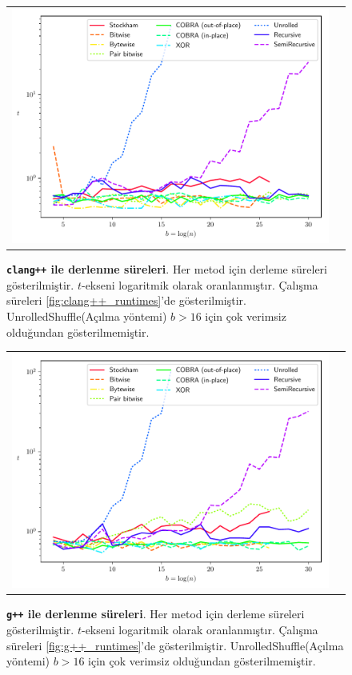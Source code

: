 \documentclass[10pt]{article}
\begin{document}
\begin{figure}[ht!]
\centering
\begin{tabular}{cc}
  \includegraphics[width=4.5in]{results/clang++_compile_times.pdf}
\end{tabular}
\caption{{\bf {\tt clang++} ile derlenme s\"{u}releri}. 
Her metod i\c{c}in derleme s\"{u}releri g\"{o}sterilmi\c{s}tir. 
$t$-ekseni logaritmik olarak oranlanm{\i}\c{s}t{\i}r. \c{C}al{\i}\c{s}ma s\"{u}releri 
\ref{fig:clang++_runtimes}'de g\"{o}sterilmi\c{s}tir. 
UnrolledShuffle(A\c{c}{\i}lma y\"{o}ntemi) $b>16$ i\c{c}in \c{c}ok 
verimsiz oldu\u{g}undan g\"{o}sterilmemi\c{s}tir.
  \label{fig:clang++_compile_times} 
}
\end{figure}

\begin{figure}[ht!]
\centering
\begin{tabular}{cc}
  \includegraphics[width=4.5in]{results/g++_compile_times.pdf}
\end{tabular}
\caption{{\bf {\tt g++} ile derlenme s\"{u}releri}.
Her metod i\c{c}in derleme s\"{u}releri g\"{o}sterilmi\c{s}tir. 
$t$-ekseni logaritmik olarak oranlanm{\i}\c{s}t{\i}r. \c{C}al{\i}\c{s}ma s\"{u}releri 
\ref{fig:g++_runtimes}'de g\"{o}sterilmi\c{s}tir. 
UnrolledShuffle(A\c{c}{\i}lma y\"{o}ntemi) $b>16$ i\c{c}in \c{c}ok 
verimsiz oldu\u{g}undan g\"{o}sterilmemi\c{s}tir.
  \label{fig:g++_compile_times} 
}
\end{figure}
\end{document}

